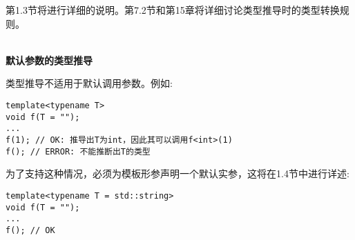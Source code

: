 第1.3节将进行详细的说明。第7.2节和第15章将详细讨论类型推导时的类型转换规则。

\hspace*{\fill} \\ %
\noindent
\textbf{默认参数的类型推导}

类型推导不适用于默认调用参数。例如:

\begin{lstlisting}[style=styleCXX]
template<typename T>
void f(T = "");
...
f(1); // OK: 推导出T为int，因此其可以调用f<int>(1)
f(); // ERROR: 不能推断出T的类型
\end{lstlisting}

为了支持这种情况，必须为模板形参声明一个默认实参，这将在1.4节中进行详述:

\begin{lstlisting}[style=styleCXX]
template<typename T = std::string>
void f(T = "");
...
f(); // OK
\end{lstlisting}














